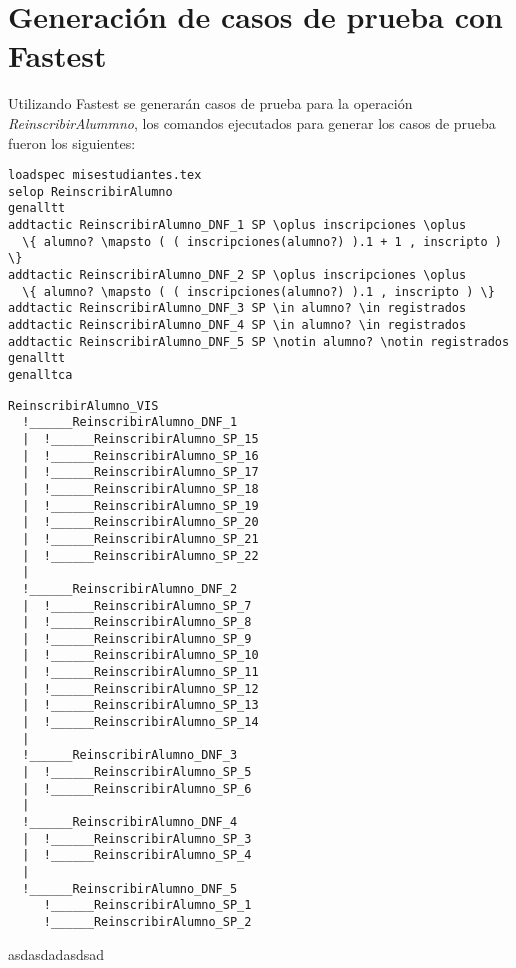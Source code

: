 \documentclass{article}
\begin{document}
\section{Generación de casos de prueba con Fastest}
Utilizando Fastest se generarán casos de prueba para la operación \emph{ReinscribirAlummno}, los comandos ejecutados para generar los casos de prueba fueron los siguientes:

\begin{verbatim}
loadspec misestudiantes.tex
selop ReinscribirAlumno
genalltt
addtactic ReinscribirAlumno_DNF_1 SP \oplus inscripciones \oplus 
  \{ alumno? \mapsto ( ( inscripciones(alumno?) ).1 + 1 , inscripto ) \}
addtactic ReinscribirAlumno_DNF_2 SP \oplus inscripciones \oplus 
  \{ alumno? \mapsto ( ( inscripciones(alumno?) ).1 , inscripto ) \}
addtactic ReinscribirAlumno_DNF_3 SP \in alumno? \in registrados
addtactic ReinscribirAlumno_DNF_4 SP \in alumno? \in registrados
addtactic ReinscribirAlumno_DNF_5 SP \notin alumno? \notin registrados
genalltt
genalltca
\end{verbatim}

\begin{verbatim}
ReinscribirAlumno_VIS
  !______ReinscribirAlumno_DNF_1
  |	 !______ReinscribirAlumno_SP_15
  |	 !______ReinscribirAlumno_SP_16
  |	 !______ReinscribirAlumno_SP_17
  |	 !______ReinscribirAlumno_SP_18
  |	 !______ReinscribirAlumno_SP_19
  |	 !______ReinscribirAlumno_SP_20
  |	 !______ReinscribirAlumno_SP_21
  |	 !______ReinscribirAlumno_SP_22
  |
  !______ReinscribirAlumno_DNF_2
  |	 !______ReinscribirAlumno_SP_7
  |	 !______ReinscribirAlumno_SP_8
  |	 !______ReinscribirAlumno_SP_9
  |	 !______ReinscribirAlumno_SP_10
  |	 !______ReinscribirAlumno_SP_11
  |	 !______ReinscribirAlumno_SP_12
  |	 !______ReinscribirAlumno_SP_13
  |	 !______ReinscribirAlumno_SP_14
  |
  !______ReinscribirAlumno_DNF_3
  |	 !______ReinscribirAlumno_SP_5
  |	 !______ReinscribirAlumno_SP_6
  |
  !______ReinscribirAlumno_DNF_4
  |	 !______ReinscribirAlumno_SP_3
  |	 !______ReinscribirAlumno_SP_4
  |
  !______ReinscribirAlumno_DNF_5
  	 !______ReinscribirAlumno_SP_1
  	 !______ReinscribirAlumno_SP_2
\end{verbatim}

asdasdadasdsad
\end{document}
